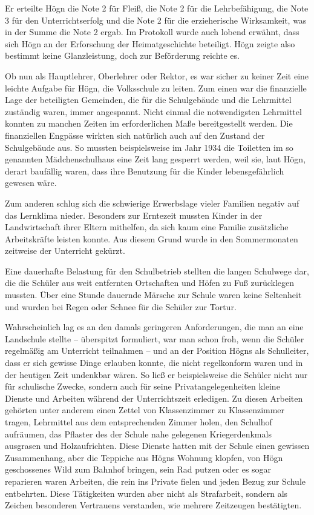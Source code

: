 \documentclass{book}
\begin{document}
Er erteilte Högn die Note 2 für Fleiß, die Note 2 für die
Lehrbefähigung, die Note 3 für den Unterrichtserfolg und die Note 2 für
die erzieherische Wirksamkeit, was in der Summe die Note 2 ergab. Im
Protokoll wurde auch lobend erwähnt, dass sich Högn an der
Erforschung der Heimatgeschichte beteiligt. Högn zeigte also bestimmt
keine Glanzleistung, doch zur Beförderung reichte es.

Ob nun als Hauptlehrer, Oberlehrer oder Rektor, es war sicher zu keiner
Zeit eine leichte Aufgabe für Högn, die Volksschule zu leiten. Zum
einen war die finanzielle Lage der beteiligten Gemeinden, die für die
Schulgebäude und die Lehrmittel zuständig waren, immer angespannt.
Nicht einmal die notwendigsten Lehrmittel konnten zu manchen Zeiten
im erforderlichen Maße bereitgestellt werden. Die finanziellen
Engpässe wirkten sich natürlich auch auf den Zustand der Schulgebäude
aus. So mussten beispielsweise im Jahr 1934 die Toiletten im so
genannten Mädchenschulhaus eine Zeit lang gesperrt werden, weil sie,
laut Högn, derart baufällig waren, dass ihre Benutzung für die Kinder
lebensgefährlich gewesen wäre.

Zum anderen schlug sich die schwierige Erwerbslage vieler Familien
negativ auf das Lernklima nieder. Besonders zur Erntezeit mussten
Kinder in der Landwirtschaft ihrer Eltern mithelfen, da sich kaum eine
Familie zusätzliche Arbeitskräfte leisten konnte. Aus diesem Grund
wurde in den Sommermonaten zeitweise der Unterricht gekürzt.

Eine dauerhafte Belastung für den Schulbetrieb stellten die langen
Schulwege dar, die die Schüler aus weit entfernten Ortschaften und
Höfen zu Fuß zurücklegen mussten. Über eine Stunde dauernde Märsche zur
Schule waren keine Seltenheit und wurden bei Regen oder Schnee für die
Schüler zur Tortur.

Wahrscheinlich lag es an den damals geringeren Anforderungen, die man an
eine Landschule stellte – überspitzt formuliert, war man schon froh,
wenn die Schüler regelmäßig am Unterricht teilnahmen – und an der
Position Högns als Schulleiter, dass er sich gewisse Dinge erlauben
konnte, die nicht regelkonform waren und in der heutigen Zeit undenkbar
wären. So ließ er beispielsweise die Schüler nicht nur für schulische
Zwecke, sondern auch für seine Privatangelegenheiten kleine Dienste
und Arbeiten während der Unterrichtszeit erledigen. Zu diesen
Arbeiten gehörten unter anderem einen Zettel von Klassenzimmer zu
Klassenzimmer tragen, Lehrmittel aus dem entsprechenden Zimmer holen,
den Schulhof aufräumen, das Pflaster des der Schule nahe gelegenen
Kriegerdenkmals ausgrasen und Holzaufrichten. Diese Dienste hatten mit
der Schule einen gewissen Zusammenhang, aber die Teppiche aus Högns
Wohnung klopfen, von Högn geschossenes Wild zum Bahnhof bringen, sein
Rad putzen oder es sogar reparieren waren Arbeiten, die rein ins
Private fielen und jeden Bezug zur Schule entbehrten. Diese Tätigkeiten
wurden aber nicht als Strafarbeit, sondern als Zeichen besonderen
Vertrauens verstanden, wie mehrere Zeitzeugen bestätigten.
\end{document}
